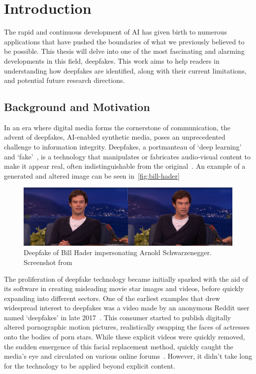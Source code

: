 
\chapter{Introduction}\label{chapter:introduction}
The rapid and continuous development of \ac{AI} has given birth to numerous
applications that have pushed the boundaries of what we previously believed to be possible.
This thesis will delve into one of the most fascinating and alarming developments in this
field, deepfakes. This work aims to help readers in understanding how deepfakes are
identified, along with their current limitations, and potential future research directions.



\section{Background and Motivation}\label{chapter:backgroundAndMotivation}
In an era where digital media forms the cornerstone of communication, the advent of deepfakes,
\ac{AI}-enabled synthetic media, poses an unprecedented challenge to information integrity.
Deepfakes, a portmanteau of `deep learning' and `fake'~\cite{Gardiner2019FacialRS,10.1145/3425780,Nguyen_2022},
is a technology that manipulates or fabricates audio-visual content to make it appear
real, often indistinguishable from the original~\cite{10.1145/3543873.3587581}. An example of a generated and altered image can be seen in~\autoref{fig:bill-hader}
\begin{figure}[hb]
	\centering
	\includegraphics[scale=0.289]{figures/bill-arnold}
	\caption{Deepfake of Bill Hader impersonating Arnold Schwarzenegger. Screenshot from~\cite{bill-hader}}\label{fig:bill-hader}
\end{figure}

The proliferation of deepfake technology became initially sparked with the aid of
its software in creating misleading movie star images and videos, before quickly
expanding into different sectors. One of the earliest examples that drew widespread
interest to deepfakes was a video made by an anonymous Reddit user named `deepfakes'
in late 2017~\cite{10.1145/3491102.3517446, 10.1145/3425780}.
This consumer started to publish digitally altered pornographic motion pictures,
realistically swapping the faces of actresses onto the bodies of porn stars.
While these explicit videos were quickly removed, the sudden emergence of this facial
replacement method, quickly caught the media's eye and circulated on various online forums~\cite{albahar2019deepfakes}.
However, it didn't take long for the technology to be applied beyond explicit content.

